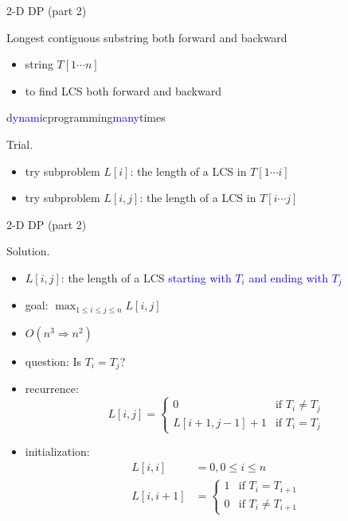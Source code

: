 \begin{frame}{2-D DP (part 2)}
  \begin{exampleblock}{Longest contiguous substring both forward and backward }
    \begin{itemize}
      \item string $T[1 \cdots n]$
      \item to find LCS both forward and backward
    \end{itemize}

    \begin{center}
      d\textcolor{blue}{ynam}icprogramming\textcolor{blue}{many}times
    \end{center}
  \end{exampleblock}

  \begin{block}{Trial.}
    \begin{itemize}
      \item try subproblem $L[i]$: the length of a LCS in $T[1 \cdots i]$
      \item try subproblem $L[i,j]$: the length of a LCS in $T[i \cdots j]$
    \end{itemize}
  \end{block}
\end{frame}
\begin{frame}{2-D DP (part 2)}
  \begin{block}{Solution.}
    \begin{itemize}
      \item $L[i,j]$: the length of a LCS \textcolor{blue}{starting with $T_{i}$ and ending with $T_{j}$}
      \item goal: $\max_{1 \le i \le j \le n} L[i,j]$
      \item $O(n^{3} \Rightarrow n^{2})$
      \item question: Is $T_{i} = T_{j}$?
      \item recurrence: 
	\begin{displaymath}
	  L[i,j] = \left\{ \begin{array}{ll}
	    0 & \textrm{if $T_{i} \neq T_{j}$}  \\
	    L[i+1,j-1] + 1 & \textrm{if $T_{i} = T_{j}$}
	  \end{array} \right.
	\end{displaymath}
      \item initialization: 
	\begin{align*}
	  L[i,i] &= 0, 0 \le i \le n  \\
	  L[i,i+1] &= \left\{ \begin{array}{ll}
	    1 & \text{if } T_{i} = T_{i+1}  \\
	    0 & \text{if } T_{i} \neq T_{i+1}
	    \end{array} \right.
	\end{align*}
    \end{itemize}
  \end{block}
\end{frame}
